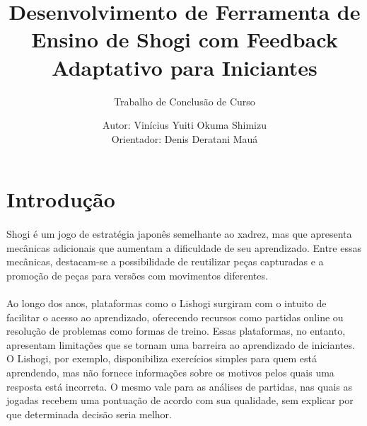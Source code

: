 \documentclass[a4paper, 11pt]{article}
\title{Desenvolvimento de Ferramenta de Ensino de Shogi com Feedback Adaptativo para Iniciantes}
\subtitle{Trabalho de Conclusão de Curso}
\author{Autor: Vinícius Yuiti Okuma Shimizu\\
        Orientador: Denis Deratani Mauá}
\date{}
\begin{document}
\onehalfspace
    \maketitle\thispagestyle{myheadings}
    \newpage

    \tableofcontents

    \newpage
    \section{Introdução}
    \paragraph{}
    Shogi é um jogo de estratégia japonês semelhante ao xadrez, mas que apresenta 
    mecânicas adicionais que aumentam a dificuldade de seu aprendizado. Entre essas mecânicas,
    destacam-se a possibilidade de reutilizar peças capturadas e a promoção de peças para versões com
    movimentos diferentes. 
    \paragraph{}
    Ao longo dos anos, plataformas como o Lishogi surgiram com o intuito 
    de facilitar o acesso ao aprendizado, oferecendo recursos como partidas online ou resolução de problemas como 
    formas de treino. Essas plataformas, no entanto, apresentam limitações que se tornam uma barreira ao aprendizado 
    de iniciantes. O Lishogi, por exemplo, disponibiliza exercícios simples para quem está aprendendo, 
    mas não fornece informações sobre os motivos pelos quais uma resposta está incorreta. O mesmo vale para 
    as análises de partidas, nas quais as jogadas recebem uma pontuação de acordo com sua qualidade, sem explicar por que
    determinada decisão seria melhor.
\end{document}
